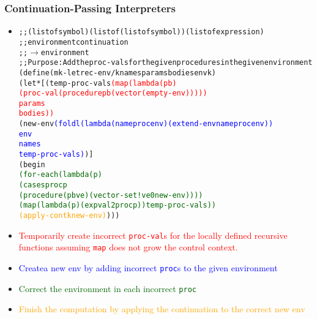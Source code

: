 \documentclass{beamer}
\newcommand{\arrow}{\(\rightarrow\)}
\begin{document}
\begin{frame}[fragile]
\frametitle{Continuation-Passing Interpreters}
\begin{tiny}
\begin{itemize}
\item<1-> 
\begin{alltt}
;; (listof symbol) (listof (listof symbol)) (listof expression)
;; environment     continuation 
;; \arrow{} environment
;; Purpose: Add the proc-vals for the given procedures in the given environment
(define (mk-letrec-env/k names params bodies env k)
  (let* [(temp-proc-vals \textcolor{red}{(map (lambda (p b)
                                (proc-val (procedure p b (vector (empty-env)))))
                              params
                              bodies))}
         (new-env \textcolor{blue}{(foldl (lambda (name proc env) (extend-env name proc env))
                         env
                         names
                         temp-proc-vals)})]
    (begin
      \textcolor{darkgreen}{(for-each (lambda (p)
                  (cases proc p
                    (procedure (p b ve) (vector-set! ve 0 new-env))))
                (map (lambda (p) (expval2proc p)) temp-proc-vals))}
      \textcolor{orange}{(apply-cont k new-env)})))
\end{alltt}

\item<1-> \textcolor{red}{Temporarily create incorrect \texttt{proc-val}s for the locally defined recursive functions assuming \texttt{map} does not grow the control context.}
    
\item<2-> \textcolor{blue}{Createa new env by adding incorrect \texttt{proc}s to the given environment}

\item<3-> \textcolor{darkgreen}{Correct the environment in each incorrect \texttt{proc}}
    
\item<4-> \textcolor{orange}{Finish the computation by applying the continuation to the correct new env}

\end{itemize}
\end{tiny}
\end{frame}
\end{document}

